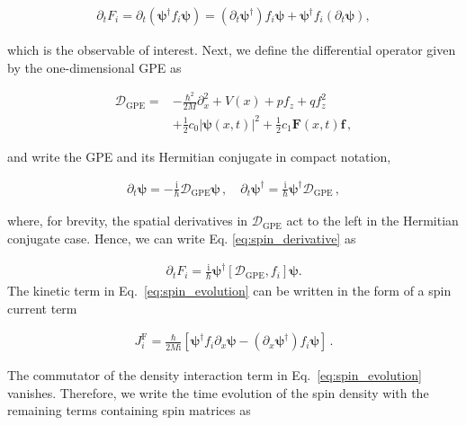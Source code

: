 \documentclass[aps,

               pra,
               twocolumn,
               amsmath,
               amssymb,
               superscriptaddress,
               reprint,
               10pt
              ]{revtex4-2}
\begin{document}
\begin{appendix}
\begin{align}
    \partial_t F_i = \partial_t \left( \boldsymbol{\psi}^\dagger f_i \boldsymbol{\psi} \right)
    = (\partial_t \boldsymbol{\psi}^\dagger) f_i \boldsymbol{\psi} + \boldsymbol{\psi}^\dagger f_i (\partial_t \boldsymbol{\psi}),
    \label{eq:spin_derivative}
\end{align}

which is the observable of interest.
Next, we define the differential operator given by the one-dimensional GPE as

\begin{align}
    \mathcal{D}_\mathrm{GPE} = &-\frac{\hbar^2}{2M}\partial_x^2+V(x)+pf_z+qf_z^2  \\&+\frac{1}{2}c_0|\boldsymbol{\psi}(x,t)|^2+\frac{1}{2}c_1\boldsymbol{F}(x,t)\boldsymbol{f}\, , \nonumber
\end{align}

and write the GPE and its Hermitian conjugate in compact notation,

\begin{align}
    \partial_t \boldsymbol{\psi} = -\frac{\mathrm{i}}{\hbar} \mathcal{D}_\mathrm{GPE}\boldsymbol{\psi} \, , \quad
    \partial_t \boldsymbol{\psi}^\dagger = \frac{\mathrm{i}}{\hbar} \boldsymbol{\psi}^\dagger \mathcal{D}_\mathrm{GPE} \, ,
\end{align}

where, for brevity, the spatial derivatives in $\mathcal{D}_\mathrm{GPE}$ act to the left in the Hermitian conjugate case.
Hence, we can write Eq. \eqref{eq:spin_derivative} as

\begin{align}
    \partial_t F_i = \frac{\mathrm{i}}{\hbar} \boldsymbol{\psi}^{\dagger} \left[\mathcal{D}_\mathrm{GPE}, f_i\right] \boldsymbol{\psi}.
    \label{eq:spin_evolution}
\end{align}
The kinetic term in Eq.~\eqref{eq:spin_evolution} can be written in the form of a spin current term

\begin{align}
    {J}^\mathrm{F}_i = \frac{\hbar}{2M \mathrm{i}}\left[ \boldsymbol{\psi}^{\dagger} f_i \partial_x \boldsymbol{\psi} - (\partial_x \boldsymbol{\psi}^{\dagger}) f_i\boldsymbol{\psi}  \right] \, .
\end{align}

The commutator of the density interaction term in Eq.~\eqref{eq:spin_evolution} vanishes. Therefore, we write the time evolution of the spin density with the remaining terms containing spin matrices as


\end{appendix}
\end{document}
